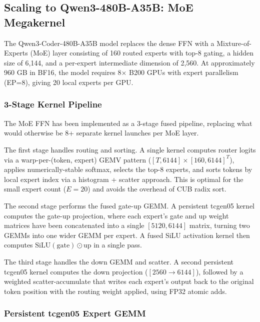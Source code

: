 \documentclass[sigplan,screen]{acmart}
\begin{document}
\subsection{Scaling to Qwen3-480B-A35B: MoE Megakernel}

The Qwen3-Coder-480B-A35B model replaces the dense FFN with a Mixture-of-Experts (MoE) layer consisting of 160 routed experts with top-8 gating, a hidden size of 6{,}144, and a per-expert intermediate dimension of 2{,}560. At approximately 960 GB in BF16, the model requires 8$\times$ B200 GPUs with expert parallelism (EP=8), giving 20 local experts per GPU.

\subsubsection{3-Stage Kernel Pipeline}

The MoE FFN has been implemented as a 3-stage fused pipeline, replacing what would otherwise be 8+ separate kernel launches per MoE layer.

The first stage handles routing and sorting. A single kernel computes router logits via a warp-per-(token, expert) GEMV pattern ($[T, 6144] \times [160, 6144]^T$), applies numerically-stable softmax, selects the top-8 experts, and sorts tokens by local expert index via a histogram + scatter approach. This is optimal for the small expert count ($E=20$) and avoids the overhead of CUB radix sort.

The second stage performs the fused gate-up GEMM. A persistent tcgen05 kernel computes the gate-up projection, where each expert's gate and up weight matrices have been concatenated into a single $[5120, 6144]$ matrix, turning two GEMMs into one wider GEMM per expert. A fused SiLU activation kernel then computes $\text{SiLU}(\text{gate}) \odot \text{up}$ in a single pass.

The third stage handles the down GEMM and scatter. A second persistent tcgen05 kernel computes the down projection ($[2560 \rightarrow 6144]$), followed by a weighted scatter-accumulate that writes each expert's output back to the original token position with the routing weight applied, using FP32 atomic adds.

\subsubsection{Persistent tcgen05 Expert GEMM}
\end{document}
